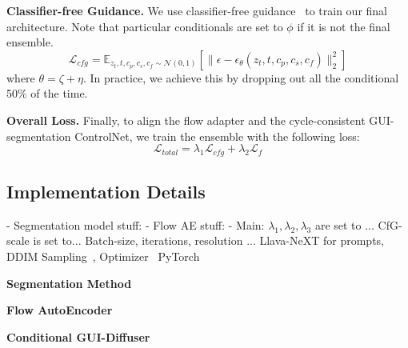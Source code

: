 \textbf{Classifier-free Guidance.}
We use classifier-free guidance~\cite{cfg} to train our final architecture. 
Note that particular conditionals are set to $\phi$ if it is not the final ensemble.
\begin{equation}
    \mathcal{L}_{cfg} = \mathbb{E}_{z_t, t, c_p, c_s, c_f \sim \mathcal{N}(0,1)} [\| \epsilon - \epsilon_{\theta}(z_t, t, c_p, c_s, c_f) \|^{2}_2]
\end{equation}
where $\theta =\zeta + \eta$.
In practice, we achieve this by dropping out all the conditional 50\% of the time.

\textbf{Overall Loss.}  
Finally, to align the flow adapter and the cycle-consistent GUI-segmentation ControlNet, we train the ensemble with the following loss: 
\begin{equation}
    \mathcal{L}_{total} = \lambda_1 \mathcal{L}_{cfg} + \lambda_2 \mathcal{L}_{f}
\end{equation}


\subsection{Implementation Details}
- Segmentation model stuff:
- Flow AE stuff:
- Main:
$\lambda_1, \lambda_2, \lambda_3$ are set to ...
CfG-scale is set to...
Batch-size, iterations, resolution ... 
Llava-NeXT for prompts, 
DDIM Sampling~\cite{}, Optimizer~\cite{} PyTorch~\cite{}



\noindent \textbf{Segmentation Method}


\noindent \textbf{Flow AutoEncoder}


\noindent \textbf{Conditional GUI-Diffuser}





